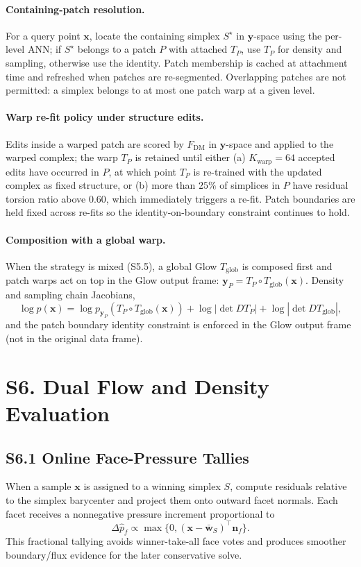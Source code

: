 \documentclass[11pt]{article}
\begin{document}
\paragraph{Containing-patch resolution.}
For a query point $\mathbf x$, locate the containing simplex $S^\star$ in $\mathbf y$-space using the per-level ANN; if $S^\star$ belongs to a patch $P$ with attached $T_P$, use $T_P$ for density and sampling, otherwise use the identity. Patch membership is cached at attachment time and refreshed when patches are re-segmented. Overlapping patches are not permitted: a simplex belongs to at most one patch warp at a given level.

\paragraph{Warp re-fit policy under structure edits.}
Edits inside a warped patch are scored by $F_{\mathrm{DM}}$ in $\mathbf y$-space and applied to the warped complex; the warp $T_P$ is retained until either (a) $K_{\mathrm{warp}}=64$ accepted edits have occurred in $P$, at which point $T_P$ is re-trained with the updated complex as fixed structure, or (b) more than $25\%$ of simplices in $P$ have residual torsion ratio above $0.60$, which immediately triggers a re-fit. Patch boundaries are held fixed across re-fits so the identity-on-boundary constraint continues to hold.

\paragraph{Composition with a global warp.}
When the strategy is mixed (S5.5), a global Glow $T_{\mathrm{glob}}$ is composed first and patch warps act on top in the Glow output frame: $\mathbf y_P=T_P\circ T_{\mathrm{glob}}(\mathbf x)$. Density and sampling chain Jacobians,
\[
\log p(\mathbf x)
=\log p_{\mathbf y_P}(T_P\circ T_{\mathrm{glob}}(\mathbf x))
+\log|\det DT_P|
+\log|\det DT_{\mathrm{glob}}|,
\]
and the patch boundary identity constraint is enforced in the Glow output frame (not in the original data frame).

\section*{S6. Dual Flow and Density Evaluation}
\label{sec:si-dual-flow}

\subsection*{S6.1 Online Face-Pressure Tallies}
When a sample $\mathbf x$ is assigned to a winning simplex $S$, compute residuals relative to the simplex barycenter and project them onto outward facet normals. Each facet receives a nonnegative pressure increment proportional to
\[
\Delta\hat p_f\propto \max\{0,(\mathbf x-\bar{\mathbf w}_S)^\top \mathbf n_f\}.
\]
This fractional tallying avoids winner-take-all face votes and produces smoother boundary/flux evidence for the later conservative solve.
\end{document}
